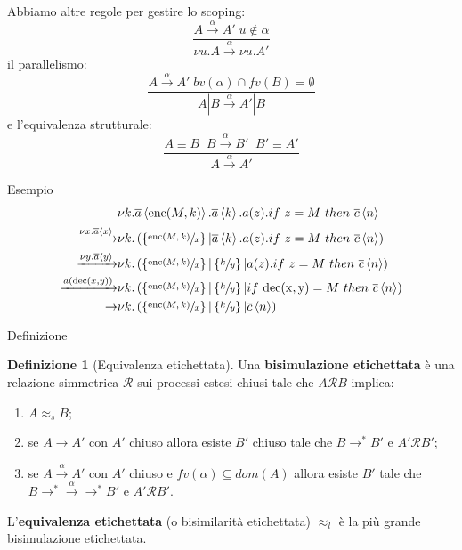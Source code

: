 \documentclass{beamer}
\newcounter{counter1}
\theoremstyle{plain}
\theoremstyle{definition}
\newtheorem{mydef}[counter1]{Definizione}
\theoremstyle{remark}
\newcommand{\obar}[1]{\overline{#1}}
\newcommand{\set}[1]{\left\{#1\right\}}
\newcommand{\pa}[1]{\left(#1\right)}
\newcommand{\ang}[1]{\left<#1\right>}
\begin{document}
\begin{frame}
  Abbiamo altre regole per gestire lo scoping:
  \[ \frac{A \xrightarrow{\alpha} A'\; u\not\in\alpha}{\nu u.A
      \xrightarrow{\alpha} \nu u.A'} \]
  il parallelismo:
  \[ \frac{A \xrightarrow{\alpha} A'\;bv(\alpha) \cap fv(B) =
      \emptyset}{A|B \xrightarrow{\alpha} A'|B} \]
  e l'equivalenza strutturale:
  \[ \frac{A \equiv B\;\; B\xrightarrow{\alpha} B'\;\; B' \equiv A'}{A
      \xrightarrow{\alpha} A'} \]
\end{frame}

\begin{frame}{Esempio}
  \begin{align*}
    & \nu k. \obar{a} \ang{\mathrm{enc}(M,k)}.\obar{a}\ang{k}.a(z).if\
      z=M\ then\ \obar{c}\ang{n} \\
    \xrightarrow{\nu x.\obar{a}\ang{x}} & \nu
                                          k.\pa{\set{\sfrac{\mathrm{enc}(M,k)}{x}}|
                                          \obar{a}\ang{k}. a(z).if\
                                          z=M\ then\ \obar{c}\ang{n}}
    \\
    \xrightarrow{\nu y.\obar{a}\ang{y}} & \nu k. \pa{
                                          \set{\sfrac{\mathrm{enc}(M,k)}{x}}
                                          | \set{\sfrac{k}{y}} |
                                          a(z).if\ z=M\ then\
                                          \obar{c}\ang{n}} \\
    \xrightarrow{a\pa{\mathrm{dec}(x,y)}} & \nu k. \pa{
                                            \set{\sfrac{\mathrm{enc}(M,k)}{x}}
                                            | \set{\sfrac{k}{y}} | if\
                                            \mathrm{dec(x,y)}=M\ then\
                                            \obar{c}\ang{n}} \\
    \rightarrow & \nu k. \pa{ \set{\sfrac{\mathrm{enc}(M,k)}{x}} |
                  \set{\sfrac{k}{y}} | \obar{c}\ang{n}} 
  \end{align*}
\end{frame}

\begin{frame}{Definizione}
  \begin{mydef}[Equivalenza etichettata]
    Una \textbf{bisimulazione etichettata} \`e una relazione
    simmetrica $\mathcal{R}$ sui processi estesi chiusi tale che $A
    \mathcal{R} B$ implica:
    \begin{enumerate}
    \item $A \approx _s B$;
    \item se $A \rightarrow A'$ con $A'$ chiuso allora esiste $B'$
      chiuso tale che $B \rightarrow ^* B'$ e $A' \mathcal{R} B'$;
    \item se $A \xrightarrow{\alpha} A'$ con $A'$ chiuso e
      $fv(\alpha) \subseteq dom(A)$ allora esiste $B'$ tale che
      $B \rightarrow ^* \xrightarrow{\alpha} \rightarrow ^* B'$ e
      $A' \mathcal{R} B'$.
    \end{enumerate}
    L'\textbf{equivalenza etichettata} (o bisimilarit\`a etichettata)
    $\approx _l$ \`e la pi\`u grande bisimulazione etichettata.
  \end{mydef}
\end{frame}
\end{document}
